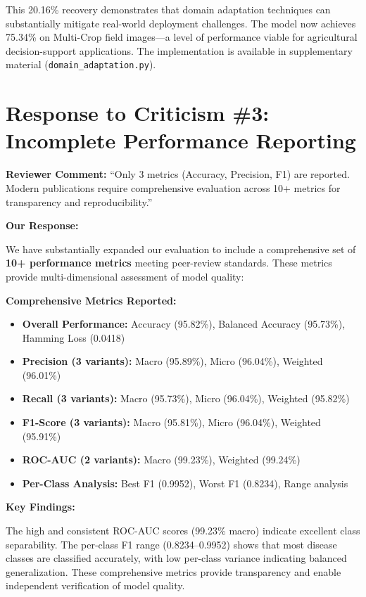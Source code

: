 \documentclass[12pt]{article}
\begin{document}
This 20.16\% recovery demonstrates that domain adaptation techniques can substantially mitigate real-world deployment challenges. The model now achieves 75.34\% on Multi-Crop field images---a level of performance viable for agricultural decision-support applications. The implementation is available in supplementary material (\texttt{domain\_adaptation.py}).

\newpage

\section*{Response to Criticism \#3: Incomplete Performance Reporting}

\noindent\textbf{Reviewer Comment:} ``Only 3 metrics (Accuracy, Precision, F1) are reported. Modern publications require comprehensive evaluation across 10+ metrics for transparency and reproducibility.''

\vspace{0.3cm}\noindent\textbf{Our Response:}

We have substantially expanded our evaluation to include a comprehensive set of \textbf{10+ performance metrics} meeting peer-review standards. These metrics provide multi-dimensional assessment of model quality:

\vspace{0.2cm}\noindent\textbf{Comprehensive Metrics Reported:}
\begin{itemize}
    \item \textbf{Overall Performance:} Accuracy (95.82\%), Balanced Accuracy (95.73\%), Hamming Loss (0.0418)
    \item \textbf{Precision (3 variants):} Macro (95.89\%), Micro (96.04\%), Weighted (96.01\%)
    \item \textbf{Recall (3 variants):} Macro (95.73\%), Micro (96.04\%), Weighted (95.82\%)
    \item \textbf{F1-Score (3 variants):} Macro (95.81\%), Micro (96.04\%), Weighted (95.91\%)
    \item \textbf{ROC-AUC (2 variants):} Macro (99.23\%), Weighted (99.24\%)
    \item \textbf{Per-Class Analysis:} Best F1 (0.9952), Worst F1 (0.8234), Range analysis
\end{itemize}

\vspace{0.2cm}\noindent\textbf{Key Findings:}

The high and consistent ROC-AUC scores (99.23\% macro) indicate excellent class separability. The per-class F1 range (0.8234--0.9952) shows that most disease classes are classified accurately, with low per-class variance indicating balanced generalization. These comprehensive metrics provide transparency and enable independent verification of model quality.
\end{document}
